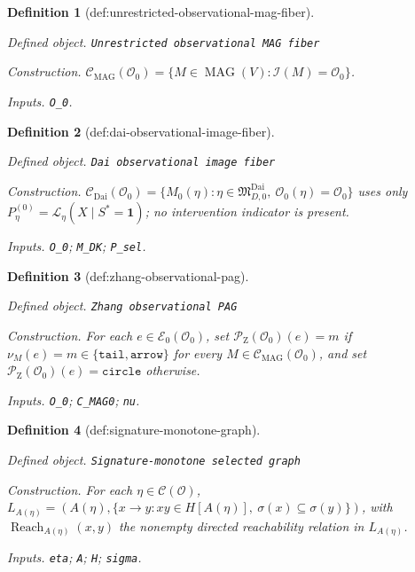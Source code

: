 \documentclass{article}
\newtheorem{definition}{Definition}
\begin{document}
\begin{definition}[def:unrestricted-observational-mag-fiber]\label{def:unrestricted-observational-mag-fiber}
\par\smallskip\noindent\emph{Defined object.} \texttt{Unrestricted observational MAG fiber}
\par\smallskip\noindent\emph{Construction.} \(\mathcal C_{\mathrm{MAG}}(\mathcal O_0)=\{M\in\operatorname{MAG}(V):\mathcal I(M)=\mathcal O_0\}\).
\par\smallskip\noindent\emph{Inputs.} \texttt{O\_\allowbreak{}0}.
\end{definition}

\begin{definition}[def:dai-observational-image-fiber]\label{def:dai-observational-image-fiber}
\par\smallskip\noindent\emph{Defined object.} \texttt{Dai observational image fiber}
\par\smallskip\noindent\emph{Construction.} \(\mathcal C_{\mathrm{Dai}}(\mathcal O_0)=\{M_0(\eta):\eta\in\mathfrak M_{D,0}^{\mathrm{Dai}},\ \mathcal O_0(\eta)=\mathcal O_0\}\) uses only \(P_{\eta}^{(0)}=\mathcal L_{\eta}(X\mid S^*=\mathbf 1)\); no intervention indicator is present.
\par\smallskip\noindent\emph{Inputs.} \texttt{O\_\allowbreak{}0}; \texttt{M\_\allowbreak{}DK}; \texttt{P\_\allowbreak{}sel}.
\end{definition}

\begin{definition}[def:zhang-observational-pag]\label{def:zhang-observational-pag}
\par\smallskip\noindent\emph{Defined object.} \texttt{Zhang observational PAG}
\par\smallskip\noindent\emph{Construction.} For each \(e\in\mathcal E_0(\mathcal O_0)\), set \(\mathcal P_{\mathrm Z}(\mathcal O_0)(e)=m\) if \(\nu_M(e)=m\in\{\mathtt{tail},\mathtt{arrow}\}\) for every \(M\in\mathcal C_{\mathrm{MAG}}(\mathcal O_0)\), and set \(\mathcal P_{\mathrm Z}(\mathcal O_0)(e)=\mathtt{circle}\) otherwise.
\par\smallskip\noindent\emph{Inputs.} \texttt{O\_\allowbreak{}0}; \texttt{C\_\allowbreak{}MAG0}; \texttt{nu}.
\end{definition}

\begin{definition}[def:signature-monotone-graph]\label{def:signature-monotone-graph}
\par\smallskip\noindent\emph{Defined object.} \texttt{Signature-\allowbreak{}monotone selected graph}
\par\smallskip\noindent\emph{Construction.} For each \(\eta\in\mathcal C(\mathcal O)\), \(L_{A(\eta)}=(A(\eta),\{x\to y:xy\in H[A(\eta)],\ \sigma(x)\subseteq\sigma(y)\})\), with \(\operatorname{Reach}_{A(\eta)}(x,y)\) the nonempty directed reachability relation in \(L_{A(\eta)}\).
\par\smallskip\noindent\emph{Inputs.} \texttt{eta}; \texttt{A}; \texttt{H}; \texttt{sigma}.
\end{definition}
\end{document}
